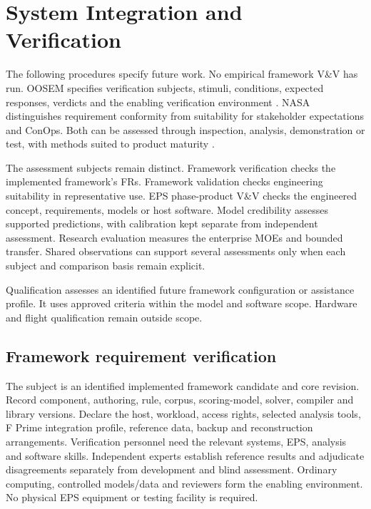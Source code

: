 \section{System Integration and Verification}
\label{section:integrate-and-verify-system}

The following procedures specify future work. No empirical framework V\&V has run. OOSEM specifies verification subjects, stimuli, conditions, expected responses, verdicts and the enabling verification environment \citep[Secs.~17.3.8--17.3.9]{friedenthal2014practical}. NASA distinguishes requirement conformity from suitability for stakeholder expectations and ConOps. Both can be assessed through inspection, analysis, demonstration or test, with methods suited to product maturity \citep[Secs.~2.4, 5.3--5.4 and Appendix~I]{nasa2016systems}.

The assessment subjects remain distinct. Framework verification checks the implemented framework's FRs. Framework validation checks engineering suitability in representative use. EPS phase-product V\&V checks the engineered concept, requirements, models or host software. Model credibility assesses supported predictions, with calibration kept separate from independent assessment. Research evaluation measures the enterprise MOEs and bounded transfer. Shared observations can support several assessments only when each subject and comparison basis remain explicit.

Qualification assesses an identified future framework configuration or assistance profile. It uses approved criteria within the model and software scope. Hardware and flight qualification remain outside scope.

\subsection{Framework requirement verification}

The subject is an identified implemented framework candidate and core revision. Record component, authoring, rule, corpus, scoring-model, solver, compiler and library versions. Declare the host, workload, access rights, selected analysis tools, F Prime integration profile, reference data, backup and reconstruction arrangements. Verification personnel need the relevant systems, EPS, analysis and software skills. Independent experts establish reference results and adjudicate disagreements separately from development and blind assessment. Ordinary computing, controlled models/data and reviewers form the enabling environment. No physical EPS equipment or testing facility is required.


